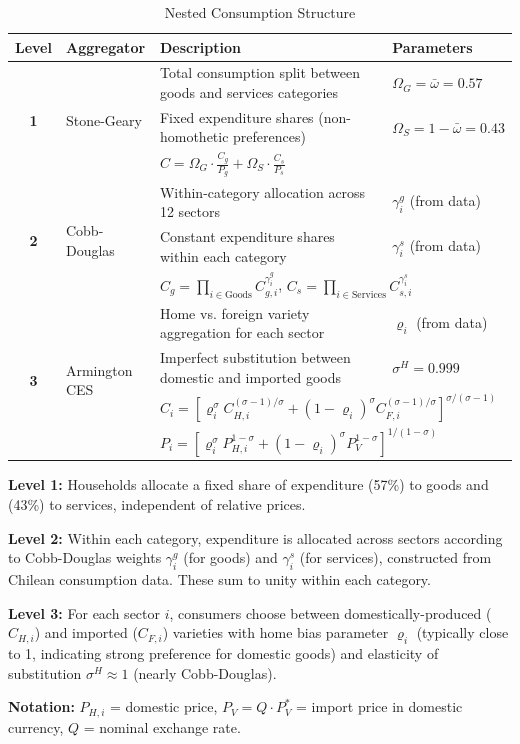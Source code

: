 \begin{table}[htbp]
\centering
\caption{Nested Consumption Structure}
\label{tab:consumption_structure}
\begin{tabular}{clp{5cm}p{4cm}}
\toprule
\textbf{Level} & \textbf{Aggregator} & \textbf{Description} & \textbf{Parameters} \\
\midrule
\multirow{3}{*}{\textbf{1}} 
& \multirow{3}{*}{Stone-Geary} 
& Total consumption split between goods and services categories
& $\Omega_G = \bar{\omega} = 0.57$ \\
& & Fixed expenditure shares (non-homothetic preferences)
& $\Omega_S = 1-\bar{\omega} = 0.43$ \\
& & \multicolumn{2}{l}{$C = \Omega_G \cdot \frac{C_g}{P_g} + \Omega_S \cdot \frac{C_s}{P_s}$} \\
\midrule
\multirow{3}{*}{\textbf{2}} 
& \multirow{3}{*}{Cobb-Douglas} 
& Within-category allocation across 12 sectors
& $\gamma^g_i$ (from data) \\
& & Constant expenditure shares within each category
& $\gamma^s_i$ (from data) \\
& & \multicolumn{2}{l}{$C_g = \prod_{i \in \text{Goods}} C_{g,i}^{\gamma^g_i}$, \quad $C_s = \prod_{i \in \text{Services}} C_{s,i}^{\gamma^s_i}$} \\
\midrule
\multirow{4}{*}{\textbf{3}} 
& \multirow{4}{*}{Armington CES} 
& Home vs. foreign variety aggregation for each sector
& $\varrho_i$ (from data) \\
& & Imperfect substitution between domestic and imported goods
& $\sigma^H = 0.999$ \\
& & \multicolumn{2}{l}{$C_i = \left[\varrho_i^\sigma C_{H,i}^{(\sigma-1)/\sigma} + (1-\varrho_i)^\sigma C_{F,i}^{(\sigma-1)/\sigma}\right]^{\sigma/(\sigma-1)}$} \\
& & \multicolumn{2}{l}{$P_i = \left[\varrho_i^\sigma P_{H,i}^{1-\sigma} + (1-\varrho_i)^\sigma P_V^{1-\sigma}\right]^{1/(1-\sigma)}$} \\
\bottomrule
\end{tabular}
\begin{tablenotes}[flushleft]
\small
\item \textbf{Level 1:} Households allocate a fixed share of expenditure (57\%) to goods and (43\%) to services, independent of relative prices.
\item \textbf{Level 2:} Within each category, expenditure is allocated across sectors according to Cobb-Douglas weights $\gamma^g_i$ (for goods) and $\gamma^s_i$ (for services), constructed from Chilean consumption data. These sum to unity within each category.
\item \textbf{Level 3:} For each sector $i$, consumers choose between domestically-produced ($C_{H,i}$) and imported ($C_{F,i}$) varieties with home bias parameter $\varrho_i$ (typically close to 1, indicating strong preference for domestic goods) and elasticity of substitution $\sigma^H \approx 1$ (nearly Cobb-Douglas).
\item \textbf{Notation:} $P_{H,i}$ = domestic price, $P_V = Q \cdot P_V^*$ = import price in domestic currency, $Q$ = nominal exchange rate.
\end{tablenotes}
\end{table}

